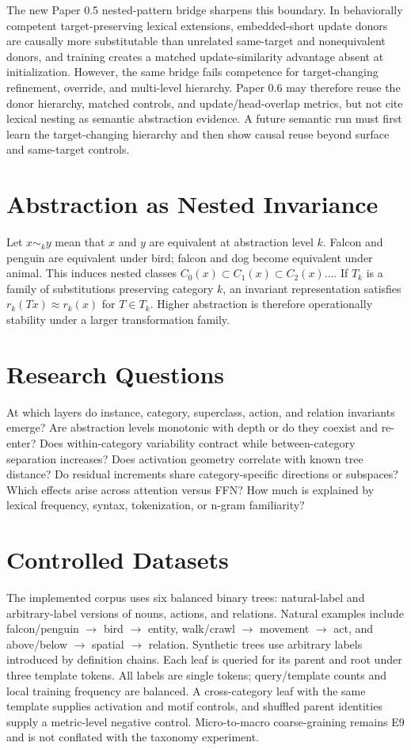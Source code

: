 \documentclass[11pt]{article}
\begin{document}
The new Paper 0.5 nested-pattern bridge sharpens this boundary. In behaviorally competent target-preserving lexical extensions, embedded-short update donors are causally more substitutable than unrelated same-target and nonequivalent donors, and training creates a matched update-similarity advantage absent at initialization. However, the same bridge fails competence for target-changing refinement, override, and multi-level hierarchy. Paper 0.6 may therefore reuse the donor hierarchy, matched controls, and update/head-overlap metrics, but not cite lexical nesting as semantic abstraction evidence. A future semantic run must first learn the target-changing hierarchy and then show causal reuse beyond surface and same-target controls.

\section{Abstraction as Nested Invariance}
Let $x\sim_k y$ mean that $x$ and $y$ are equivalent at abstraction level $k$. Falcon and penguin are equivalent under bird; falcon and dog become equivalent under animal. This induces nested classes $C_0(x)\subset C_1(x)\subset C_2(x)\ldots$. If $T_k$ is a family of substitutions preserving category $k$, an invariant representation satisfies $r_k(Tx)\approx r_k(x)$ for $T\in T_k$. Higher abstraction is therefore operationally stability under a larger transformation family.

\section{Research Questions}
At which layers do instance, category, superclass, action, and relation invariants emerge? Are abstraction levels monotonic with depth or do they coexist and re-enter? Does within-category variability contract while between-category separation increases? Does activation geometry correlate with known tree distance? Do residual increments share category-specific directions or subspaces? Which effects arise across attention versus FFN? How much is explained by lexical frequency, syntax, tokenization, or n-gram familiarity?

\section{Controlled Datasets}
The implemented corpus uses six balanced binary trees: natural-label and arbitrary-label versions of nouns, actions, and relations. Natural examples include falcon/penguin $\rightarrow$ bird $\rightarrow$ entity, walk/crawl $\rightarrow$ movement $\rightarrow$ act, and above/below $\rightarrow$ spatial $\rightarrow$ relation. Synthetic trees use arbitrary labels introduced by definition chains. Each leaf is queried for its parent and root under three template tokens. All labels are single tokens; query/template counts and local training frequency are balanced. A cross-category leaf with the same template supplies activation and motif controls, and shuffled parent identities supply a metric-level negative control. Micro-to-macro coarse-graining remains E9 and is not conflated with the taxonomy experiment.
\end{document}
